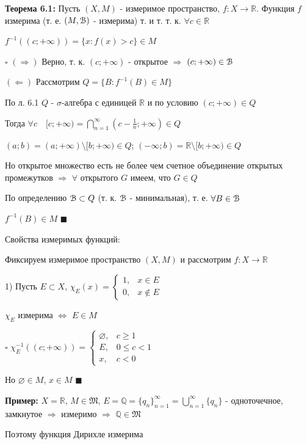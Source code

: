 \documentclass[a4paper]{report}
\begin{document}
\noindent\textbf{Теорема 6.1:} Пусть $(X,M)$ - измеримое пространство, $f\colon X\to\mathbb R$. Функция $f$ измерима
(т. е. $(M,\EuScript B)$ - измерима) т. и т. т. к. $\forall c\in\mathbb R$ 

$f^{-1}\left((c;+\infty)\right)=\{x\colon
f(x)>c\}\in M$

$\square$ $(\Rightarrow)$ Верно, т. к. $(c;+\infty)$ - открытое $\Rightarrow$ $(c;+\infty)\in\EuScript B$

$(\Leftarrow)$ Рассмотрим $Q=\{B\colon f^{-1}(B)\in M\}$

По л. 6.1 $Q$ - $\sigma$-алгебра с единицей $\mathbb R$ и по условию $(c;+\infty)\in Q$

Тогда $\forall c\quad [c;+\infty)=\bigcap\limits_{n=1}^\infty(c-\frac1n;+\infty)\in Q$

$(a;b)=(a;+\infty)\setminus[b;+\infty)\in Q$; $(-\infty;b)=\mathbb R\setminus[b;+\infty)\in Q$

Но открытое множество есть не более чем счетное объединение открытых промежутков $\Rightarrow$ $\forall$ открытого 
$G$ имеем, что $G\in Q$

По определению $\EuScript B\subset Q$ (т. к. $\EuScript B$ - минимальная), т. е. $\forall B\in\EuScript B$
 
$f^{-1}(B)\in M$ $\blacksquare$
\bigskip

\noindent Свойства измеримых функций:

Фиксируем измеримое пространство $(X,M)$ и рассмотрим $f\colon X\to\mathbb R$

1) Пусть $E\subset X$, $\chi_E(x)=\begin{cases} 1,&x\in E\\0,&x\notin E\end{cases}$

$\chi_E$ измерима $\Leftrightarrow$ $E\in M$

\noindent $\square$ $\chi_E^{-1}\left((c;+\infty)\right)=\begin{cases}\varnothing,&c\ge1\\E,&0\le c<1\\x,&c<0\end{cases}$

Но $\varnothing\in M$, $x\in M$ $\blacksquare$
\bigskip

\noindent\textbf{Пример:} $X=\mathbb R$, $M\in\mathfrak M$, $E=\mathbb Q=\{q_n\}_{n=1}^\infty=\bigcup\limits_{n=1}^\infty
\{q_n\}$ - одноточечное, замкнутое $\Rightarrow$ измеримо $\Rightarrow$ $\mathbb Q\in\mathfrak M$

Поэтому функция Дирихле измерима
\bigskip
\end{document}
